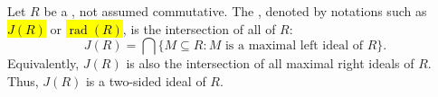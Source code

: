 \begin{definition} \label{definition:jacobson_radical_of_a_ring}
Let $R$ be a , not assumed commutative.  
The , denoted by notations such as \hl{$J(R)$} or \hl{$\operatorname{rad}(R)$}, 
is the intersection of all  of $R$:
$$J(R) = \bigcap \{ M \subseteq R : M \text{ is a maximal left ideal of } R \}.$$
Equivalently, $J(R)$ is also the intersection of all maximal right ideals of $R$. Thus, $J(R)$ is a two-sided ideal of $R$.
\end{definition}
